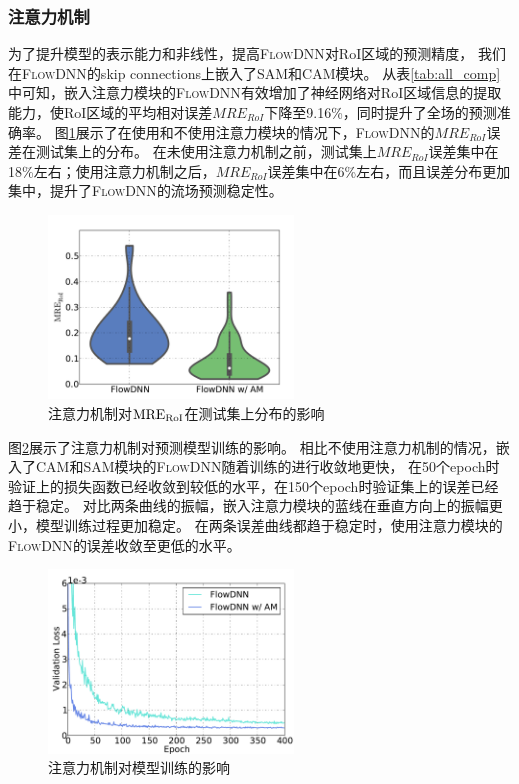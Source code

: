 \subsubsection{注意力机制}
为了提升模型的表示能力和非线性，提高\textsc{FlowDNN}对RoI区域的预测精度，
我们在\textsc{FlowDNN}的skip connections上嵌入了SAM和CAM模块。
从表\ref{tab:all_comp}中可知，嵌入注意力模块的\textsc{FlowDNN}有效增加了神经网络对RoI区域信息的提取能力，使RoI区域的平均相对误差$MRE_{RoI}$下降至9.16\%，同时提升了全场的预测准确率。
图\ref{fig:attention_violin}展示了在使用和不使用注意力模块的情况下，\textsc{FlowDNN}的$MRE_{RoI}$误差在测试集上的分布。
在未使用注意力机制之前，测试集上$MRE_{RoI}$误差集中在18\%左右；使用注意力机制之后，$MRE_{RoI}$误差集中在6\%左右，而且误差分布更加集中，提升了\textsc{FlowDNN}的流场预测稳定性。

\begin{figure}[htp]
	\centering
	\includegraphics[width=0.58\textwidth]{./figures/data/data_pre/error_s_compare_violin.pdf}
	
	\caption{注意力机制对$\rm{MRE_{RoI}}$在测试集上分布的影响}
	\label{fig:attention_violin}
\end{figure}

图\ref{fig:attention_val_loss_comp}展示了注意力机制对预测模型训练的影响。
相比不使用注意力机制的情况，嵌入了CAM和SAM模块的\textsc{FlowDNN}随着训练的进行收敛地更快，
在50个epoch时验证上的损失函数已经收敛到较低的水平，在150个epoch时验证集上的误差已经趋于稳定。
对比两条曲线的振幅，嵌入注意力模块的蓝线在垂直方向上的振幅更小，模型训练过程更加稳定。
在两条误差曲线都趋于稳定时，使用注意力模块的\textsc{FlowDNN}的误差收敛至更低的水平。

\begin{figure}[htp]
	\centering
	\includegraphics[width=0.58\textwidth]{./figures/data/am_comp.pdf}
	\caption{注意力机制对模型训练的影响}
	\label{fig:attention_val_loss_comp}
\end{figure}

